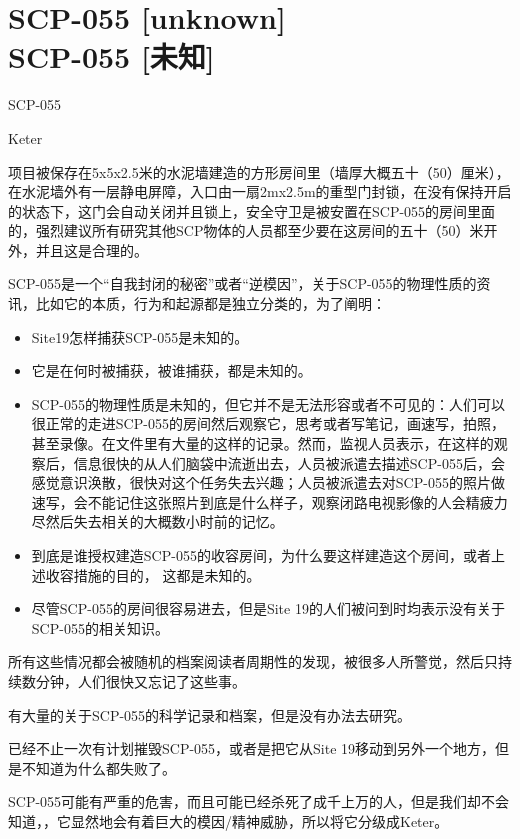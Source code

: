 \chapter[SCP-055 {[}未知{]}]{
    SCP-055 [unknown]\\
    SCP-055 [未知]\\
    \heritage
}

\label{chap:SCP-055}

SCP-055

Keter

项目被保存在5x5x2.5米的水泥墙建造的方形房间里（墙厚大概五十（50）厘米），在水泥墙外有一层静电屏障，入口由一扇2mx2.5m的重型门封锁，在没有保持开启的状态下，这门会自动关闭并且锁上，安全守卫是被安置在SCP-055的房间里面的，强烈建议所有研究其他SCP物体的人员都至少要在这房间的五十（50）米开外，并且这是合理的。

SCP-055是一个“自我封闭的秘密”或者“逆模因”，关于SCP-055的物理性质的资讯，比如它的本质，行为和起源都是独立分类的，为了阐明：

\begin{itemize}
\item Site19怎样捕获SCP-055是未知的。
\item 它是在何时被捕获，被谁捕获，都是未知的。
\item SCP-055的物理性质是未知的，但它并不是无法形容或者不可见的：人们可以很正常的走进SCP-055的房间然后观察它，思考或者写笔记，画速写，拍照，甚至录像。在文件里有大量的这样的记录。然而，监视人员表示，在这样的观察后，信息很快的从人们脑袋中流逝出去，人员被派遣去描述SCP-055后，会感觉意识涣散，很快对这个任务失去兴趣；人员被派遣去对SCP-055的照片做速写，会不能记住这张照片到底是什么样子，观察闭路电视影像的人会精疲力尽然后失去相关的大概数小时前的记忆。
\item 到底是谁授权建造SCP-055的收容房间，为什么要这样建造这个房间，或者上述收容措施的目的， 这都是未知的。
\item 尽管SCP-055的房间很容易进去，但是Site 19的人们被问到时均表示没有关于SCP-055的相关知识。
\end{itemize}

所有这些情况都会被随机的档案阅读者周期性的发现，被很多人所警觉，然后只持续数分钟，人们很快又忘记了这些事。

有大量的关于SCP-055的科学记录和档案，但是没有办法去研究。

已经不止一次有计划摧毁SCP-055，或者是把它从Site 19移动到另外一个地方，但是不知道为什么都失败了。

SCP-055可能有严重的危害，而且可能已经杀死了成千上万的人，但是我们却不会知道，，它显然地会有着巨大的模因\slash 精神威胁，所以将它分级成Keter。

